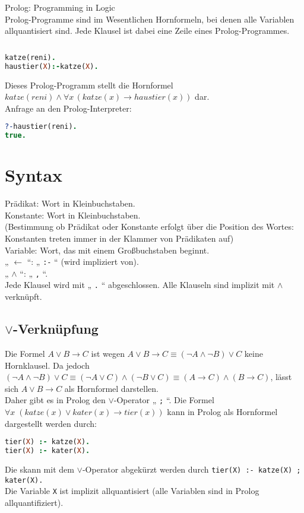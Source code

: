 Prolog: Programming in Logic\\
Prolog-Programme sind im Wesentlichen Hornformeln, bei denen alle Variablen allquantisiert sind. Jede Klausel ist dabei eine Zeile eines Prolog-Programmes.

$ $
\begin{lstlisting}[language=Prolog]
katze(reni).
haustier(X):-katze(X).
\end{lstlisting}
Dieses Prolog-Programm stellt die Hornformel $katze(reni) \wedge \forall x \, (katze(x) \to haustier(x))$ dar.\\
Anfrage an den Prolog-Interpreter:
\begin{lstlisting}[language=Prolog]
?-haustier(reni).
true.
\end{lstlisting}

\section{Syntax}
Prädikat: Wort in Kleinbuchstaben.\\
Konstante: Wort in Kleinbuchstaben.\\
(Bestimmung ob Prädikat oder Konstante erfolgt über die Position des Wortes: Konstanten treten immer in der Klammer von Prädikaten auf)\\
Variable: Wort, das mit einem Großbuchstaben beginnt.\\
„ $\leftarrow$ “: „ \lstinline$:-$ “ (wird impliziert von).\\
„ $\wedge$ “: „ \lstinline$,$ “.\\
Jede Klausel wird mit „ \lstinline$.$ “ abgeschlossen. Alle Klauseln sind implizit mit $\wedge$ verknüpft.

\subsection*{$\vee$-Verknüpfung}
Die Formel $A\vee B \to C$ ist wegen $A\vee B \to C \equiv (\neg A \wedge \neg B ) \vee C$ keine Hornklausel. Da jedoch $(\neg A \wedge \neg B ) \vee C \equiv (\neg A \vee C) \wedge (\neg B \vee C) \equiv (A\to C) \wedge (B \to C)$, lässt sich $A \vee B \to C$ als Hornformel darstellen.\\
Daher gibt es in Prolog den $\vee$-Operator „ \lstinline$;$ “.
 Die Formel $\forall x \; (katze(x) \vee kater(x) \to tier(x) )$ kann in Prolog als Hornformel dargestellt werden durch:
\begin{lstlisting}[language=Prolog]
tier(X) :- katze(X).
tier(X) :- kater(X).
\end{lstlisting}
Die skann mit dem $\vee$-Operator abgekürzt werden durch \lstinline$tier(X) :- katze(X) ; kater(X).$\\
Die Variable \lstinline$X$ ist implizit allquantisiert (alle Variablen sind in Prolog allquantifiziert).

